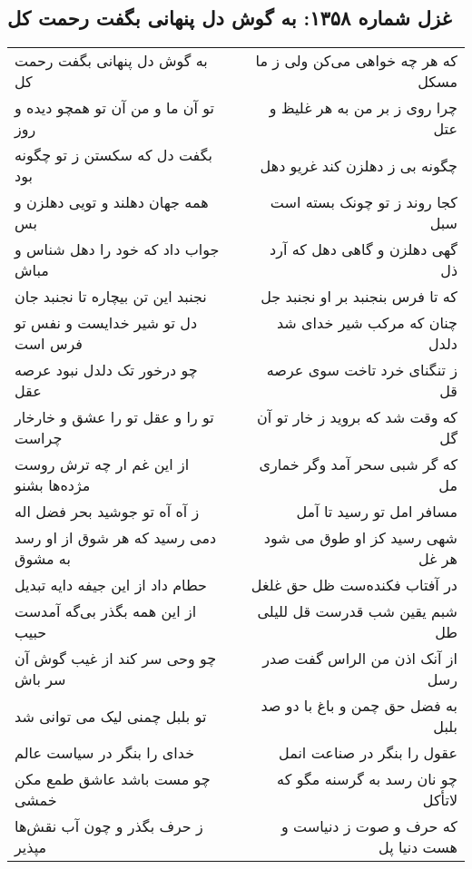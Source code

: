 \begin{center}
\section*{غزل شماره ۱۳۵۸: به گوش دل پنهانی بگفت رحمت کل}
\label{sec:1358}
\begin{longtable}{l p{0.5cm} r}
به گوش دل پنهانی بگفت رحمت کل
&&
که هر چه خواهی می‌کن ولی ز ما مسکل
\\
تو آن ما و من آن تو همچو دیده و روز
&&
چرا روی ز بر من به هر غلیظ و عتل
\\
بگفت دل که سکستن ز تو چگونه بود
&&
چگونه بی ز دهلزن کند غریو دهل
\\
همه جهان دهلند و تویی دهلزن و بس
&&
کجا روند ز تو چونک بسته است سبل
\\
جواب داد که خود را دهل شناس و مباش
&&
گهی دهلزن و گاهی دهل که آرد ذل
\\
نجنبد این تن بیچاره تا نجنبد جان
&&
که تا فرس بنجنبد بر او نجنبد جل
\\
دل تو شیر خدایست و نفس تو فرس است
&&
چنان که مرکب شیر خدای شد دلدل
\\
چو درخور تک دلدل نبود عرصه عقل
&&
ز تنگنای خرد تاخت سوی عرصه قل
\\
تو را و عقل تو را عشق و خارخار چراست
&&
که وقت شد که بروید ز خار تو آن گل
\\
از این غم ار چه ترش روست مژده‌ها بشنو
&&
که گر شبی سحر آمد وگر خماری مل
\\
ز آه آه تو جوشید بحر فضل اله
&&
مسافر امل تو رسید تا آمل
\\
دمی رسید که هر شوق از او رسد به مشوق
&&
شهی رسید کز او طوق می شود هر غل
\\
حطام داد از این جیفه دایه تبدیل
&&
در آفتاب فکنده‌ست ظل حق غلغل
\\
از این همه بگذر بی‌گه آمدست حبیب
&&
شبم یقین شب قدرست قل للیلی طل
\\
چو وحی سر کند از غیب گوش آن سر باش
&&
از آنک اذن من الراس گفت صدر رسل
\\
تو بلبل چمنی لیک می توانی شد
&&
به فضل حق چمن و باغ با دو صد بلبل
\\
خدای را بنگر در سیاست عالم
&&
عقول را بنگر در صناعت انمل
\\
چو مست باشد عاشق طمع مکن خمشی
&&
چو نان رسد به گرسنه مگو که لاتأکل
\\
ز حرف بگذر و چون آب نقش‌ها مپذیر
&&
که حرف و صوت ز دنیاست و هست دنیا پل
\\
\end{longtable}
\end{center}
